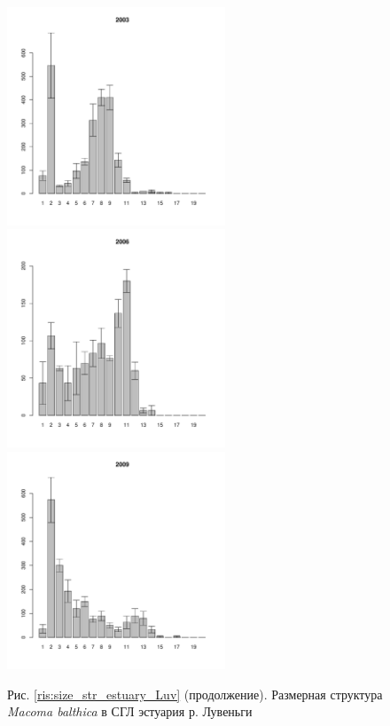 \documentclass[12pt, a4paper]{article}
\begin{document}
\begin{figure}[h]
\begin{multicols}{3}
\hfill
\includegraphics[width=65mm]{../White_Sea/Estuatiy_Luvenga/sizestr_2003_.pdf}
\hfill
\includegraphics[width=65mm]{../White_Sea/Estuatiy_Luvenga/sizestr_2006_.pdf}
\hfill
\includegraphics[width=65mm]{../White_Sea/Estuatiy_Luvenga/sizestr_2009_.pdf}
\end{multicols}



\begin{center}
Рис. \ref{ris:size_str_estuary_Luv} (продолжение). Размерная структура {\it Macoma balthica} в СГЛ эстуария р. Лувеньги

\end{center}
\end{figure}
\end{document}
